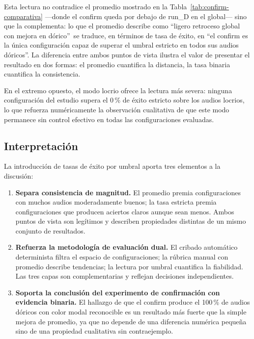 \documentclass[%
    school=etsisi,%
    type=pfg,%
    degree=61CD,%
]{upm-report}
\begin{document}
Esta lectura no contradice el promedio mostrado en la Tabla~\ref{tab:confirm-comparativa} ---donde el confirm queda por debajo de run\_D en el global--- sino que la complementa: lo que el promedio describe como \textquotedblleft ligero retroceso global con mejora en d\'orico\textquotedblright\ se traduce, en t\'erminos de tasa de \'exito, en \textquotedblleft el confirm es la \'unica configuraci\'on capaz de superar el umbral estricto en todos sus audios d\'oricos\textquotedblright. La diferencia entre ambos puntos de vista ilustra el valor de presentar el resultado en dos formas: el promedio cuantifica la distancia, la tasa binaria cuantifica la consistencia.

En el extremo opuesto, el modo locrio ofrece la lectura m\'as severa: ninguna configuraci\'on del estudio supera el 0\,\% de \'exito estricto sobre los audios locrios, lo que refuerza num\'ericamente la observaci\'on cualitativa de que este modo permanece sin control efectivo en todas las configuraciones evaluadas.

\subsection{Interpretaci\'on}

La introducci\'on de tasas de \'exito por umbral aporta tres elementos a la discusi\'on:

\begin{enumerate}
    \item \textbf{Separa consistencia de magnitud.} El promedio premia configuraciones con muchos audios moderadamente buenos; la tasa estricta premia configuraciones que producen aciertos claros aunque sean menos. Ambos puntos de vista son leg\'itimos y describen propiedades distintas de un mismo conjunto de resultados.
    \item \textbf{Refuerza la metodolog\'ia de evaluaci\'on dual.} El cribado autom\'atico determinista filtra el espacio de configuraciones; la r\'ubrica manual con promedio describe tendencias; la lectura por umbral cuantifica la fiabilidad. Las tres capas son complementarias y reflejan decisiones independientes.
    \item \textbf{Soporta la conclusi\'on del experimento de confirmaci\'on con evidencia binaria.} El hallazgo de que el confirm produce el 100\,\% de audios d\'oricos con color modal reconocible es un resultado m\'as fuerte que la simple mejora de promedio, ya que no depende de una diferencia num\'erica peque\~na sino de una propiedad cualitativa sin contraejemplo.
\end{enumerate}
\end{document}
